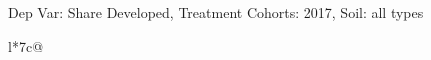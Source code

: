 \begin{table}[H]
\captionlistentry[table]{}
\label{table:beaver_land_class_DVis_land_class_3_SCg2_SSall_soil}
\scriptsize %
Dep Var: Share Developed, Treatment Cohorts: 2017, Soil: all types \\
\begin{threeparttable}
\begin{tabulary}{\textwidth}{l*{7}{c}@{}}
\toprule \toprule
\noalign{\smallskip}
\noalign{\smallskip}
\midrule \bottomrule
\end{tabulary}
\medskip
\end{threeparttable}
\end{table}
